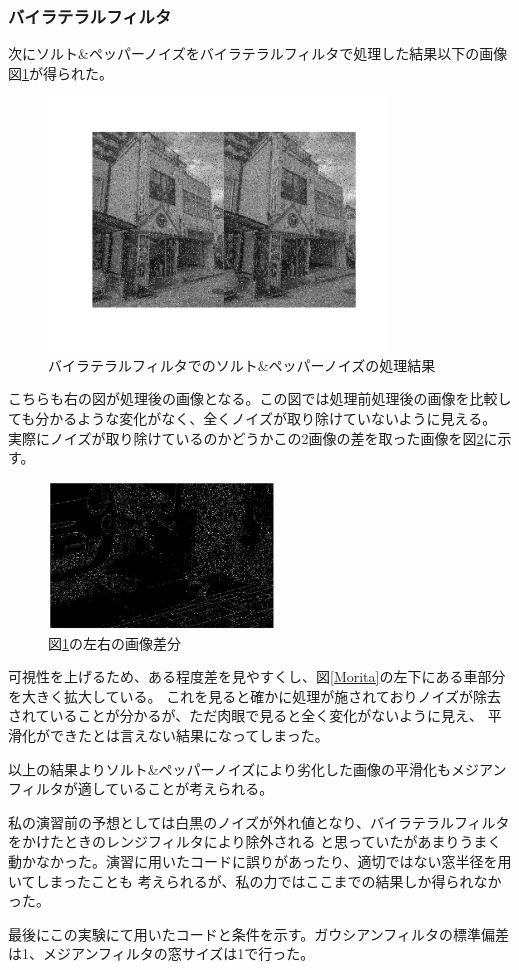 \documentclass[a4paper,11pt,dvipdfmx]{jsarticle}
\begin{document}
\subsubsection{バイラテラルフィルタ}
次にソルト\&ペッパーノイズをバイラテラルフィルタで処理した結果以下の画像図\ref{sp_bil}が得られた。
\begin{figure}[h]
    \centering
    \includegraphics[width=90mm]{./img/sp_bil.jpg}
    \caption{バイラテラルフィルタでのソルト\&ペッパーノイズの処理結果}
    \label{sp_bil}
\end{figure}
こちらも右の図が処理後の画像となる。この図では処理前処理後の画像を比較しても分かるような変化がなく、全くノイズが取り除けていないように見える。
実際にノイズが取り除けているのかどうかこの2画像の差を取った画像を図\ref{sa}に示す。
\begin{figure}[h]
    \centering
    \includegraphics[width=60mm]{./img/untitled~2.jpg}
    \caption{図\ref{sp_bil}の左右の画像差分}
    \label{sa}
\end{figure}

可視性を上げるため、ある程度差を見やすくし、図\ref{Morita}の左下にある車部分を大きく拡大している。
これを見ると確かに処理が施されておりノイズが除去されていることが分かるが、ただ肉眼で見ると全く変化がないように見え、
平滑化ができたとは言えない結果になってしまった。

以上の結果よりソルト\&ペッパーノイズにより劣化した画像の平滑化もメジアンフィルタが適していることが考えられる。

私の演習前の予想としては白黒のノイズが外れ値となり、バイラテラルフィルタをかけたときのレンジフィルタにより除外される
と思っていたがあまりうまく動かなかった。演習に用いたコードに誤りがあったり、適切ではない窓半径を用いてしまったことも
考えられるが、私の力ではここまでの結果しか得られなかった。

最後にこの実験にて用いたコードと条件を示す。ガウシアンフィルタの標準偏差は1、メジアンフィルタの窓サイズは1で行った。

\end{document}
